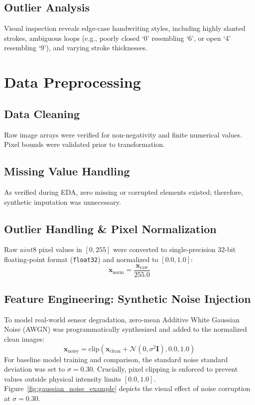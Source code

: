\documentclass[12pt, a4paper]{article}
\begin{document}
\subsection{Outlier Analysis}
Visual inspection reveals edge-case handwriting styles, including highly slanted strokes, ambiguous loops (e.g., poorly closed `0' resembling `6', or open `4' resembling `9'), and varying stroke thicknesses.


\section{Data Preprocessing}

\subsection{Data Cleaning}
Raw image arrays were verified for non-negativity and finite numerical values. Pixel bounds were validated prior to transformation.

\subsection{Missing Value Handling}
As verified during EDA, zero missing or corrupted elements existed; therefore, synthetic imputation was unnecessary.

\subsection{Outlier Handling \& Pixel Normalization}
Raw $uint8$ pixel values in $[0, 255]$ were converted to single-precision 32-bit floating-point format (\texttt{float32}) and normalized to $[0.0, 1.0]$:
\begin{equation}
    \mathbf{x}_{\text{norm}} = \frac{\mathbf{x}_{\text{raw}}}{255.0}
\end{equation}

\subsection{Feature Engineering: Synthetic Noise Injection}
To model real-world sensor degradation, zero-mean Additive White Gaussian Noise (AWGN) was programmatically synthesized and added to the normalized clean images:
\begin{equation}
    \mathbf{x}_{\text{noisy}} = \text{clip}\left(\mathbf{x}_{\text{clean}} + \mathcal{N}(0, \sigma^2 \mathbf{I}), 0.0, 1.0\right)
\end{equation}
For baseline model training and comparison, the standard noise standard deviation was set to $\sigma = 0.30$. Crucially, pixel clipping is enforced to prevent values outside physical intensity limits $[0.0, 1.0]$. Figure~\ref{fig:gaussian_noise_example} depicts the visual effect of noise corruption at $\sigma = 0.30$.
\end{document}

